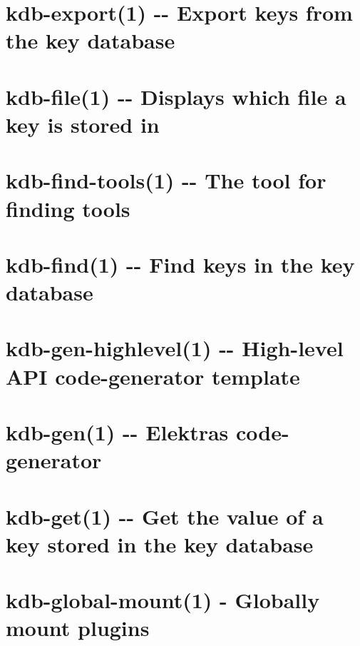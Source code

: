 \documentclass[twoside]{book}
\newcommand{\+}{\discretionary{\mbox{\scriptsize$\hookleftarrow$}}{}{}}
\begin{document}
\chapter{kdb-\/export(1) -\/-\/ Export keys from the key database}
\label{doc_help_kdb-export_md}

\chapter{kdb-\/file(1) -\/-\/ Displays which file a key is stored in}
\label{doc_help_kdb-file_md}

\chapter{kdb-\/find-\/tools(1) -\/-\/ The tool for finding tools}
\label{doc_help_kdb-find-tools_md}

\chapter{kdb-\/find(1) -\/-\/ Find keys in the key database}
\label{doc_help_kdb-find_md}

\chapter{kdb-\/gen-\/highlevel(1) -\/-\/ High-\/level A\+PI code-\/generator template}
\label{doc_help_kdb-gen-highlevel_md}

\chapter{kdb-\/gen(1) -\/-\/ Elektra\textquotesingle{}s code-\/generator}
\label{doc_help_kdb-gen_md}

\chapter{kdb-\/get(1) -\/-\/ Get the value of a key stored in the key database}
\label{doc_help_kdb-get_md}

\chapter{kdb-\/global-\/mount(1) -\/ Globally mount plugins}
\label{doc_help_kdb-global-mount_md}

\end{document}
